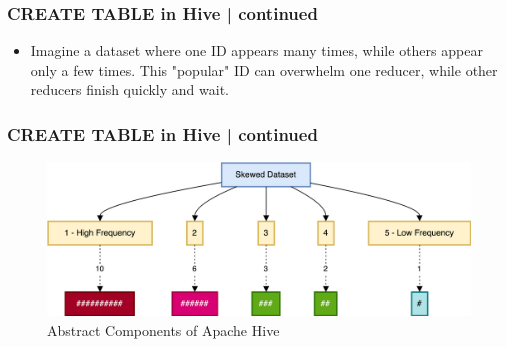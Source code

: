 	\begin{frame}[fragile]
		\frametitle{CREATE TABLE in Hive | continued}    
		\vspace{-0.5cm}		
		\begin{tcolorbox}[colback=white,colframe=black,title= Part 10: Data Skewing]
				\begin{itemize}
					\item Imagine a dataset where one ID appears many times, while others appear only a few times. This "popular" ID can overwhelm one reducer, while other reducers finish quickly and wait.					
				\end{itemize}
				\begin{table}
					\caption{Example of Skewed Data}
					\end{table}
		\end{tcolorbox}
		\end{frame}

	
		\begin{frame}[fragile]
			\frametitle{CREATE TABLE in Hive | continued}  
			\vspace{-0.5cm}		
			\begin{tcolorbox}[colback=white,colframe=black,title= Part 10: Data Skewing]	
				\begin{figure}
					\includegraphics[width=\textwidth,height=.7\textheight,keepaspectratio]{./Figures/chapter-03/dwh_hive-skweed_dt.png}	
					\caption{Abstract Components of Apache Hive}
				\end{figure}
			\end{tcolorbox}
		\end{frame}


